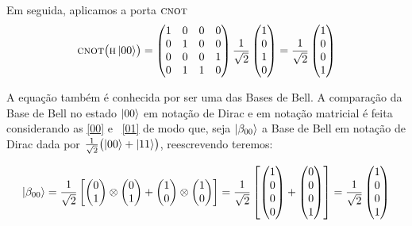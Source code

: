 Em seguida, aplicamos a porta \(\operatorname{\textsc{cnot}}\)
\begin{equation}
  \operatorname{\textsc{cnot}} \bigl( \operatorname{\textsc{h}} \ket{00} \bigr) =
\begin{pmatrix}
1 & 0 & 0 & 0 \\
0 & 1 & 0 & 0 \\
0 & 0 & 0 & 1 \\
0 & 1 & 1 & 0
\end{pmatrix}
\frac{1}{\sqrt{2}}\begin{pmatrix}
1 \\
0 \\
1 \\
0
\end{pmatrix} = \frac{1}{\sqrt{2}} \begin{pmatrix}
1 \\
0 \\
0 \\
1
\end{pmatrix}
\end{equation}

A equação também é conhecida por ser uma das Bases de Bell. A comparação da Base de Bell no estado $\ket{00}$ em notação de Dirac e em notação matricial é feita considerando as \eqref{00} e ~\eqref{01} de modo que, seja \(\ket{\beta_{00}}\) a Base de Bell em notação de Dirac dada por \(\frac{1}{\sqrt{2}} \bigl(\ket{00} + \ket{11}\bigr)\), reescrevendo teremos:

\begin{equation}\label{comparacaobeta}
\ket{\beta_{00}} = \frac{1}{\sqrt{2}} \left[ \begin{pmatrix}
0 \\
1
\end{pmatrix} \otimes \begin{pmatrix}
0 \\
1
\end{pmatrix} + \begin{pmatrix}
1 \\
0
\end{pmatrix} \otimes \begin{pmatrix}
1 \\
0
\end{pmatrix}\right] = \frac{1}{\sqrt{2}} \left[ \begin{pmatrix}
1 \\
0 \\
0 \\
0 
\end{pmatrix} + \begin{pmatrix}
0 \\
0 \\
0 \\
1 
\end{pmatrix}\right] = \frac{1}{\sqrt{2}} \begin{pmatrix}
1 \\
0 \\
0 \\
1 
\end{pmatrix}
\end{equation}

